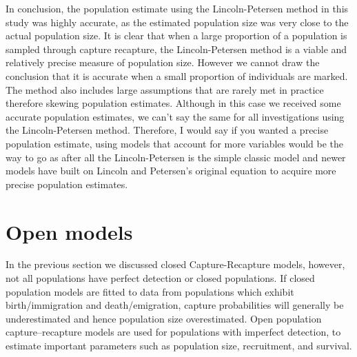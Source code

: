 \documentclass[,oneside]{article}
\numberwithin{equation}{section}
\begin{document}
 In conclusion, the population estimate using the Lincoln-Petersen method in this study was highly accurate, as the estimated population size was very close to the actual population size. It is clear that when a large proportion of a population is sampled through capture recapture, the Lincoln-Petersen method is a viable and relatively precise measure of population size. However we cannot draw the conclusion that it is accurate when a small proportion of individuals are marked. The method also includes large assumptions that are rarely met in practice therefore skewing population estimates. Although in this case we received some accurate population estimates, we can’t say the same for all investigations using the Lincoln-Petersen method. Therefore, I would say if you wanted a precise population estimate, using models that account for more variables would be the way to go as after all the Lincoln-Petersen is the simple classic model and newer models have built on Lincoln and Petersen’s original equation to acquire more precise population estimates.
\section{\large{Open models}}
In the previous section we discussed closed Capture-Recapture models, however, not all populations have perfect detection or closed populations. If closed population models are fitted to data from populations which exhibit birth/immigration and death/emigration, capture probabilities will generally be underestimated and hence population size overestimated. \cite{Ap92} Open population capture–recapture models are used for populations with imperfect detection, to estimate important parameters such as population size, recruitment, and survival. \cite{Ap93}
\end{document}
